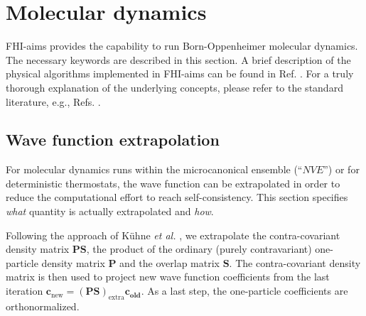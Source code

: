 \section{Molecular dynamics}
\label{Sec:MD}

FHI-aims provides the capability to run Born-Oppenheimer molecular
dynamics. The necessary keywords are described in this section. A
brief description of the physical algorithms implemented in FHI-aims
can be found in Ref. \cite{Blum08}. For a truly thorough explanation
of the underlying concepts, please refer to the standard literature,
e.g., Refs. \cite{frenkelsmit,bondjcompphys1999}.

\subsection*{Wave function extrapolation}

For molecular dynamics runs within the microcanonical ensemble (``$NVE$'') or
for deterministic thermostats, the wave function can be extrapolated in order
to reduce the computational effort to reach self-consistency.  This section
specifies \emph{what} quantity is actually extrapolated and \emph{how}.

Following the approach of K\"uhne \emph{et al.}  \cite{Kue07}, we extrapolate
the contra-covariant density matrix $\mathbf P \mathbf S$, the product of the
ordinary (purely contravariant) one-particle density matrix $\mathbf P$ and
the overlap matrix $\mathbf S$.  The contra-covariant density matrix is then
used to project new wave function coefficients from the last iteration
$\mathbf c_{\mathrm{new}} = (\mathbf P \mathbf S)_{\mathrm{extra}} \mathbf
c_{\mathbf{old}}$.  As a last step, the one-particle coefficients are
orthonormalized.

